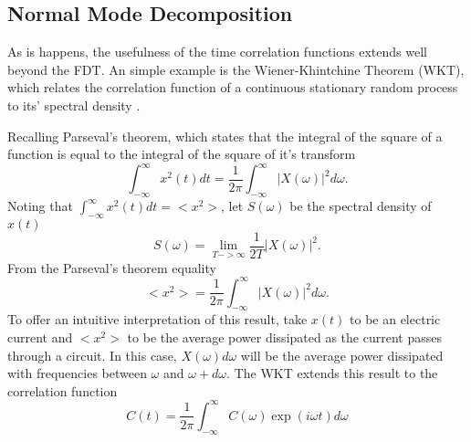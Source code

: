 \subsection{Normal Mode Decomposition}
As is happens, the usefulness of the time correlation functions extends well beyond the FDT. An simple example is the Wiener-Khintchine Theorem (WKT), which relates the correlation function of a continuous stationary random process to its' spectral density \cite{mcquarrie2000statistical}.
\begin{comment}
The correlation function of a time-dependent quantity (i.e: position, velocity, etc.) is defined as the average behaviour in time of said quantity \cite{mcquarrie2000statistical}
%
\begin{equation}
C(t)=\lim_{T->\infty}\frac{1}{2T}\int_{-T}^{T}x(t+t')x(t')dt'
\end{equation}
%
From the ergodic hypothesis, as used in the Section ~\ref{}%
\begin{equation}
C(t)=<x(t+t')x(t')>.
\end{equation}
%
Let's define $X(\omega)$ as the Fourier Transform of $x(t)$
%
\begin{equation}
X(\omega)=\int_{-\infty}^{\infty}x(t)\exp{-i\omega t}dt.
\end{equation}
%
\end{comment}
Recalling Parseval's theorem, which states that the integral of the square of a function is equal to the integral of the square of it's transform
%
\begin{equation}
\int_{-\infty}^{\infty}x^2(t)dt=\frac{1}{2\pi}\int_{-\infty}^{\infty}|X(\omega)|^2d\omega.
\end{equation}
%
Noting that $\int_{-\infty}^{\infty}x^2(t)dt=<x^2>$, let $S(\omega)$ be the spectral density of $x(t)$
%
\begin{equation}
S(\omega)=\lim_{T->\infty}\frac{1}{2T}|X(\omega)|^2.
\end{equation}
%
From the Parseval's theorem equality
%
\begin{equation}
<x^2>=\frac{1}{2\pi}\int_{-\infty}^{\infty}|X(\omega)|^2d\omega.
\end{equation}
%
To offer an intuitive interpretation of this result, take $x(t)$ to be an electric current and $<x^2>$ to be the average power dissipated as the current passes through a circuit. In this case, $X(\omega)d\omega$ will be the average power dissipated with frequencies between $\omega$ and $\omega+d\omega$. The WKT extends this result to the correlation function
%
\begin{equation}
C(t)=\frac{1}{2\pi}\int_{-\infty}^{\infty}C(\omega)\exp(i\omega t)d\omega
\end{equation}
